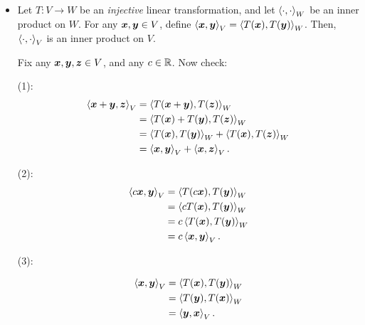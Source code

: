 \begin{enumerate}
\begin{itemize}
\begin{pf}
(3):

\[
\inner{\vect{u}}{\vect{v}}'
=r\inner{\vect{u}}{\vect{v}}
=r\inner{\vect{v}}{\vect{u}}
=\inner{\vect{v}}{\vect{u}}'.
\]

(4): When \(\vect{v}\ne\vect{0}\),
\[
\inner{\vect{v}}{\vect{v}}'=r\underbrace{\inner{\vect{v}}{\vect{v}}}_{>0}
>0.
\]
\end{pf}

\begin{note}
The positivity of \(r\) is only needed for proving (4).
\end{note}


\item Let \(T:V\to W\) be an \emph{injective} linear transformation, and let
\(\left\langle \cdot,\cdot\right\rangle_W\) be an inner product on \(W\). For any
\(\vb*{x},\vb*{y}\in V\), define
\(\left\langle \vb*{x},\vb*{y}\right\rangle_V=\left\langle T(\vb*{x}),T(\vb*{y})\right\rangle_W\). Then,
\(\left\langle \cdot,\cdot\right\rangle_V\) is an inner product on \(V\).

\begin{pf}
Fix any \(\vb*{x},\vb*{y},\vb*{z}\in V\), and any \(c\in\mathbb{R}\). Now check:

(1):
\begin{align*}
\left\langle \vb*{x}+\vb*{y},\vb*{z}\right\rangle_{V}
&=\left\langle T(\vb*{x}+\vb*{y}),T(\vb*{z})\right\rangle_{W} \\
&=\left\langle T(\vb*{x})+T(\vb*{y}),T(\vb*{z})\right\rangle_{W} \\
&=\left\langle T(\vb*{x}),T(\vb*{y})\right\rangle_{W} + \left\langle T(\vb*{x}),T(\vb*{z})\right\rangle_{W} \\
&=\left\langle \vb*{x},\vb*{y}\right\rangle_V+\left\langle \vb*{x},\vb*{z}\right\rangle_{V}.
\end{align*}

(2):
\begin{align*}
\left\langle c\vb*{x},\vb*{y}\right\rangle_{V}
&=\left\langle T(c\vb*{x}),T(\vb*{y})\right\rangle_{W} \\
&=\left\langle cT(\vb*{x}),T(\vb*{y})\right\rangle_{W} \\
&=c\left\langle T(\vb*{x}),T(\vb*{y})\right\rangle_{W}\\
&=c\left\langle \vb*{x},\vb*{y}\right\rangle_V.
\end{align*}

(3):

\begin{align*}
\left\langle \vb*{x},\vb*{y}\right\rangle_{V}
&=\left\langle T(\vb*{x}),T(\vb*{y})\right\rangle_{W}\\
&=\left\langle T(\vb*{y}),T(\vb*{x})\right\rangle_{W}\\
&=\left\langle \vb*{y},\vb*{x}\right\rangle_{V}.
\end{align*}


\end{pf}
\end{itemize}
\end{enumerate}
